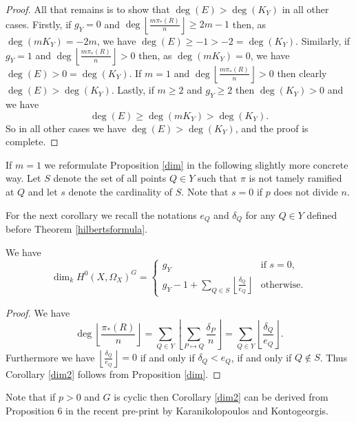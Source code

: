 \begin{proof}
All that remains is to show that $\deg(E)>\deg(K_Y)$ in all other cases.
Firstly, if $g_Y=0$ and $\deg \left\lfloor\frac{m\pi_*(R)}{n} \right\rfloor \geq 2m-1$ then, as $\deg(mK_Y)=-2m$, we have $\deg \left( E \right) \geq -1 >-2 = \deg(K_Y)$.
Similarly, if $g_Y=1$ and $\deg \left\lfloor\frac{m\pi_*(R)}{n} \right\rfloor >0$ then, as $\deg \left( mK_Y \right)=0$, we have $\deg \left( E \right) > 0 = \deg (K_Y)$.
If $m=1$ and $\deg \left\lfloor\frac{m\pi_*(R)}{n} \right\rfloor >0$ then clearly $\deg \left( E \right) > \deg (K_Y)$.
Lastly, if $m\geq 2$ and $g_Y\geq 2$ then $\deg (K_Y) > 0$ and we have 
\begin{equation*}
\deg \left( E \right) \geq \deg\left( mK_Y \right) > \deg (K_Y).
\end{equation*}
So in all other cases we have $\deg(E)>\deg(K_Y)$, and the proof is complete.
\end{proof}


If $m=1$ we reformulate Proposition \ref{dim} in the following slightly more concrete way. 
Let $S$ denote the set of all points $Q\in Y$ such that $\pi$ is not tamely ramified at $Q$ and let $s$ denote the cardinality of $S$. 
Note that $s=0$ if $p$ does not divide $n$.


For the next corollary we recall the notations $e_Q$ and $\delta_Q$ for any $Q\in Y$ defined before Theorem \ref{hilbertsformula}.


\begin{cor}\label{dim2}
We have 
\begin{equation*}
\dim_kH^0(X,\Omega_X)^G = 
\begin{cases}
g_Y & \mbox{if } s=0, \\
g_Y-1+\sum_{Q\in S}\left\lfloor \frac{\delta_Q}{e_Q} \right\rfloor & \mbox{otherwise}.
\end{cases}
\end{equation*}
\end{cor}
\begin{proof}
We have
\[
\deg\left\lfloor\frac{\pi_*(R)}{n} \right\rfloor = \sum_{Q\in Y}\left\lfloor\sum_{P\mapsto Q} \frac{\delta_P}{n} \right\rfloor = \sum_{Q\in Y} \left\lfloor \frac{\delta_Q}{e_Q} \right\rfloor.
\]
Furthermore we have $\left\lfloor \frac{\delta_Q}{e_Q} \right\rfloor = 0$ if and only if $\delta_Q<e_Q$, \ie if and only if $Q\notin S$. 
Thus Corollary \ref{dim2} follows from Proposition \ref{dim}.
\end{proof}

\begin{rem}
Note that if $p>0$ and $G$ is cyclic then Corollary \ref{dim2} can be derived from Proposition $6$ in the recent pre-print
\cite{kako} by Karanikolopoulos and Kontogeorgis.
\end{rem}

